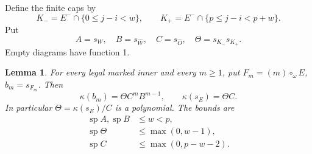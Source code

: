 \documentclass[11pt,a4paper]{amsart}
\numberwithin{equation}{section}
\theoremstyle{plain}
\newtheorem{lemma}[theorem]{Lemma}
\theoremstyle{definition}
\begin{document}
Define the finite caps by
\begin{equation}\label{eq:caps}
 K_-=E^-\cap\{0\le j-i<w\},\qquad
 K_+=E^-\cap\{p\le j-i<p+w\}.
\end{equation}
Put
\begin{equation}\label{eq:normalization}
 A=s_W,\quad B=s_{\widehat W},\quad C=s_{\widehat O},\quad
 \Theta=s_{K_-}s_{K_+}.
\end{equation}
Empty diagrams have function 1.

\begin{lemma}\label{lem:row-amalgamation}
For every legal marked inner and every \(m\ge1\), put \(F_m=(m)\circ_\omega E\), \(b_m=s_{F_m}\).  Then
\begin{equation}\label{eq:row-cofactor}
 \kappa(b_m)=\Theta C^m B^{m-1},\qquad
 \kappa(s_E)=\Theta C.
\end{equation}
In particular \(\Theta=\kappa(s_E)/C\) is a polynomial.  The bounds are
\begin{equation}\label{eq:normalization-bounds}
 \begin{split}
 \operatorname{sp}A,\operatorname{sp}B&\le w<p,\\
 \operatorname{sp}\Theta&\le\max(0,w-1),\\
 \operatorname{sp}C&\le\max(0,p-w-2).
 \end{split}
\end{equation}
\end{lemma}
\end{document}
